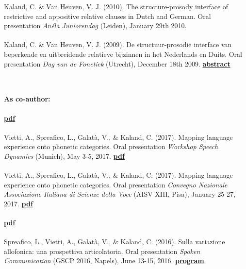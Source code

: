 \documentclass[a4paper,11pt]{article}
\begin{document}
Kaland, C. \& Van Heuven, V. J. (2010). The structure-prosody interface of restrictive and appositive relative clauses in Dutch and German. Oral presentation \textit{An\'ela Juniorendag} (Leiden), January 29th 2010.\\\\
Kaland, C. \& Van Heuven, V. J. (2009). De structuur-prosodie interface van beperkende en uitbreidende relatieve bijzinnen in het Nederlands en Duits. Oral presentation \textit{Dag van de Fonetiek} (Utrecht), December 18th 2009. \textcolor{red}{\textbf{\lbrack\href{http://www.fon.hum.uva.nl/FonetischeVereniging/DvdFonetiek/DagvdFonetiek2009abstracts.html\#10:40}{abstract}\rbrack}}\\\\\

\noindent\textbf{As co-author:}\\\\
 \textcolor{red}{\textbf{\lbrack\href{http://intro2psycholing.net/ICPhS/papers/ICPhS_2543.pdf}{pdf}\rbrack}}\\\\
Vietti, A., Spreafico, L., Galat\`a, V., \& Kaland, C. (2017). Mapping language experience onto phonetic categories. Oral presentation \textit{Workshop Speech Dynamics} (Munich), May 3-5, 2017. \textcolor{red}{\textbf{\lbrack\href{http://www.phonetik.uni-muenchen.de/institut/veranstaltungen/abstraction-diversity-dynamics/bilder/DYNAMICS_2017_paper_34.pdf}{pdf}\rbrack}}\\\\
Vietti, A., Spreafico, L., Galat\`a, V., \& Kaland, C. (2017). Mapping language experience onto phonetic categories. Oral presentation \textit{Convegno Nazionale Associazione Italiana di Scienze della Voce} (AISV XIII, Pisa), January 25-27, 2017. \textcolor{red}{\textbf{\lbrack\href{http://linguistica.sns.it/AISV/abstract/Vietti\%20et\%20al..pdf}{pdf}\rbrack}}\\\\
 \textcolor{red}{\textbf{\lbrack\href{http://www.isca-speech.org/archive/Interspeech_2016/pdfs/0434.PDF}{pdf}\rbrack}}\\\\
Spreafico, L., Vietti, A., Galat\`a, V., \& Kaland, C. (2016). Sulla variazione allofonica: una prospettiva articolatoria. Oral presentation \textit{Spoken Communication} (GSCP 2016, Napels), June 13-15, 2016. \textcolor{red}{\textbf{\lbrack\href{http://www.sli-gscp.it/index.php/programme}{program}\rbrack}}\\\\
\end{document}
